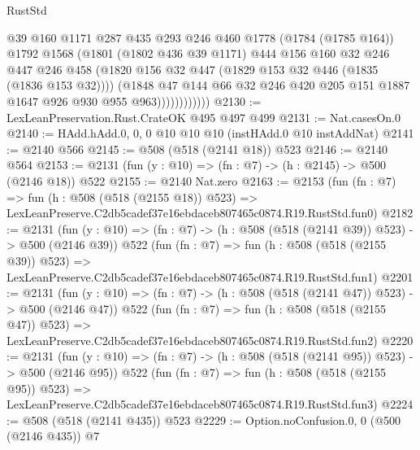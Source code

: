 \begin{lexlean}{RustStd}
\begin{coremodule}
                        @39
                        @160
                        @1171
                        @287
                        @435
                        @293
                        @246
                        @460
                        @1778
                        (@1784 (@1785 @164))
                        @1792
                        @1568
                        (@1801
                          (@1802 @436 @39 @1171)
                          @444
                          @156
                          @160
                          @32
                          @246
                          @447
                          @246
                          @458
                          (@1820 @156 @32 @447 (@1829 @153 @32 @446 (@1835 (@1836 @153 @32))))
                          (@1848
                            @47
                            @144
                            @66
                            @32
                            @246
                            @420
                            @205
                            @151
                            @1887
                            @1647
                            @926
                            @930
                            @955
                            @963))))))))))))
@2130 := LexLeanPreservation.Rust.CrateOK @495 @497 @499
@2131 := Nat.casesOn.{0}
@2140 := HAdd.hAdd.{0, 0, 0} @10 @10 @10 (instHAdd.{0} @10 instAddNat)
@2141 := @2140 @566
@2145 := @508 (@518 (@2141 @18)) @523
@2146 := @2140 @564
@2153 := @2131 (fun (y : @10) => (fn : @7) -> (h : @2145) -> @500 (@2146 @18)) @522
@2155 := @2140 Nat.zero
@2163 := @2153
    (fun (fn : @7) =>
    fun (h : @508 (@518 (@2155 @18)) @523) =>
    LexLeanPreserve.C2db5cadef37e16ebdaceb807465c0874.R19.RustStd.fun0)
@2182 := @2131
    (fun (y : @10) => (fn : @7) -> (h : @508 (@518 (@2141 @39)) @523) -> @500 (@2146 @39))
    @522
    (fun (fn : @7) =>
    fun (h : @508 (@518 (@2155 @39)) @523) =>
    LexLeanPreserve.C2db5cadef37e16ebdaceb807465c0874.R19.RustStd.fun1)
@2201 := @2131
    (fun (y : @10) => (fn : @7) -> (h : @508 (@518 (@2141 @47)) @523) -> @500 (@2146 @47))
    @522
    (fun (fn : @7) =>
    fun (h : @508 (@518 (@2155 @47)) @523) =>
    LexLeanPreserve.C2db5cadef37e16ebdaceb807465c0874.R19.RustStd.fun2)
@2220 := @2131
    (fun (y : @10) => (fn : @7) -> (h : @508 (@518 (@2141 @95)) @523) -> @500 (@2146 @95))
    @522
    (fun (fn : @7) =>
    fun (h : @508 (@518 (@2155 @95)) @523) =>
    LexLeanPreserve.C2db5cadef37e16ebdaceb807465c0874.R19.RustStd.fun3)
@2224 := @508 (@518 (@2141 @435)) @523
@2229 := Option.noConfusion.{0, 0} (@500 (@2146 @435)) @7

\end{coremodule}
\end{lexlean}
